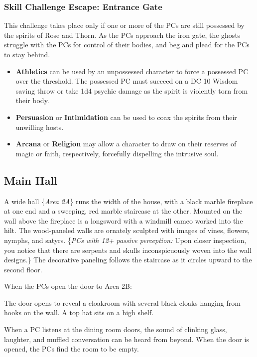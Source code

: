 \subsubsection*{Skill Challenge Escape: Entrance Gate}
\label{sec:SC_EntranceGate}
This challenge takes place only if one or more of the PCs are still possessed by the spirits of Rose and Thorn.
As the PCs approach the iron gate, the ghosts struggle with the PCs for control of their bodies, and beg and
plead for the PCs to stay behind.
\begin{skillChallenge}
  \begin{itemize}
    \item \textbf{Athletics} can be used by an unpossessed character to force a possessed PC over the threshold.
    The possessed PC must succeed on a DC 10 Wisdom saving throw or take 1d4 psychic damage as the spirit is
    violently torn from their body. \hardDC
    \item \textbf{Persuasion} or \textbf{Intimidation} can be used to coax the spirits from their unwilling
    hosts. \easyDC
    \item \textbf{Arcana} or \textbf{Religion} may allow a character to draw on their reserves of magic or faith,
    respectively, forcefully dispelling the intrusive soul. \moderateDC
  \end{itemize}
\end{skillChallenge}

\begin{arealinks}
  \item {}
\end{arealinks}


\pagebreak
\subsection{Main Hall}
\label{sec:MainHall}
\begin{readout}
  A wide hall \{\textit{Area 2A}\} runs the width of the house, with a black marble fireplace at one end and
  a sweeping, red marble staircase at the other. Mounted on the wall above the fireplace is a longsword with a
  windmill cameo worked into the hilt. The wood-paneled walls are ornately sculpted with images of vines,
  flowers, nymphs, and satyrs. \{\textit{PCs with 12+ passive perception:} Upon closer inspection, you notice
  that there are serpents and skulls inconspicuously woven into the wall designs.\} The decorative paneling
  follows the staircase as it circles upward to the second floor.
\end{readout}
When the PCs open the door to Area 2B:
\begin{readout}
  The door opens to reveal a cloakroom with several black cloaks hanging from hooks on the wall. A top hat
  sits on a high shelf.
\end{readout}
When a PC listens at the dining room doors, the sound of clinking glass, laughter, and muffled conversation can be heard from beyond. When the door is opened, the PCs find the room to be empty.

